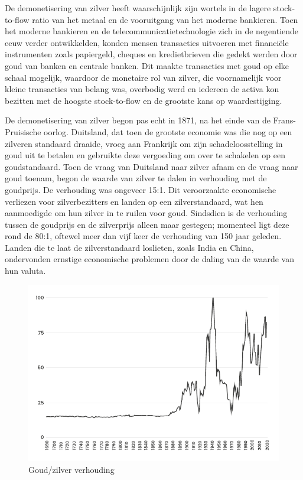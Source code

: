 De demonetisering van zilver heeft waarschijnlijk zijn wortels in de lagere stock-to-flow ratio van het metaal en de vooruitgang van het moderne bankieren. Toen het moderne bankieren en de telecommunicatietechnologie zich in de negentiende eeuw verder ontwikkelden, konden mensen transacties uitvoeren met financiële instrumenten zoals papiergeld, cheques en kredietbrieven die gedekt werden door goud van banken en centrale banken. Dit maakte transacties met goud op elke schaal mogelijk, waardoor de monetaire rol van zilver, die voornamelijk voor kleine transacties van belang was, overbodig werd en iedereen de activa kon bezitten met de hoogste stock-to-flow en de grootste kans op waardestijging.

De demonetisering van zilver begon pas echt in 1871, na het einde van de Frans-Pruisische oorlog. Duitsland, dat toen de grootste economie was die nog op een zilveren standaard draaide, vroeg aan Frankrijk om zijn schadeloosstelling in goud uit te betalen en gebruikte deze vergoeding om over te schakelen op een goudstandaard. Toen de vraag van Duitsland naar zilver afnam en de vraag naar goud toenam, begon de waarde van zilver te dalen in verhouding met de goudprijs. De verhouding was ongeveer 15:1. Dit veroorzaakte economische verliezen voor zilverbezitters en landen op een zilverstandaard, wat hen aanmoedigde om hun zilver in te ruilen voor goud. Sindsdien is de verhouding tussen de goudprijs en de zilverprijs alleen maar gestegen; momenteel ligt deze rond de 80:1, oftewel meer dan vijf keer de verhouding van 150 jaar geleden. Landen die te laat de zilverstandaard loslieten, zoals India en China, ondervonden ernstige economische problemen door de daling van de waarde van hun valuta.

\begin{figure}[!htb]
\centering
    \includegraphics[width=\textwidth]{figures/fig19.pdf}
    \caption[Goud/zilver verhouding]{Goud/zilver verhouding}
    \label{fig19}
\end{figure}

